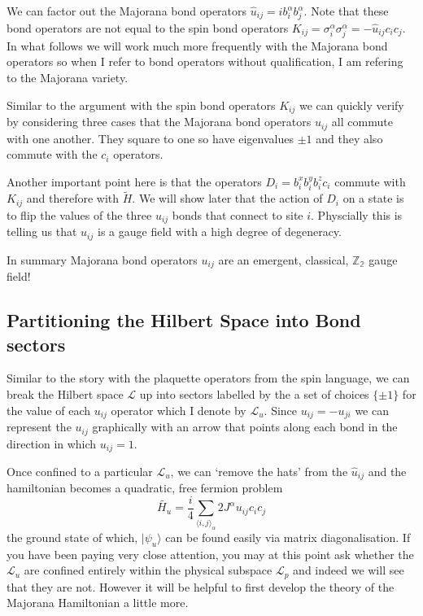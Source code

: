 We can factor out the Majorana bond operators
\(\hat{u}_{ij} = i b^\alpha_i b^\alpha_j\). Note that these bond
operators are not equal to the spin bond operators
\(K_{ij} = \sigma^\alpha_i \sigma^\alpha_j = - \hat{u}_{ij} c_i c_j\).
In what follows we will work much more frequently with the Majorana bond
operators so when I refer to bond operators without qualification, I am
refering to the Majorana variety.

Similar to the argument with the spin bond operators \(K_{ij}\) we can
quickly verify by considering three cases that the Majorana bond
operators \(u_{ij}\) all commute with one another. They square to one so
have eigenvalues \(\pm 1\) and they also commute with the \(c_i\)
operators.

Another important point here is that the operators
\(D_i = b^x_i b^y_i b^z_i c_i\) commute with \(K_{ij}\) and therefore
with \(\tilde{H}\). We will show later that the action of \(D_i\) on a
state is to flip the values of the three \(u_{ij}\) bonds that connect
to site \(i\). Physcially this is telling us that \(u_{ij}\) is a gauge
field with a high degree of degeneracy.

In summary Majorana bond operators \(u_{ij}\) are an emergent,
classical, \(\mathbb{Z_2}\) gauge field!

\hypertarget{partitioning-the-hilbert-space-into-bond-sectors}{%
\subsection{Partitioning the Hilbert Space into Bond
sectors}\label{partitioning-the-hilbert-space-into-bond-sectors}}

Similar to the story with the plaquette operators from the spin
language, we can break the Hilbert space \(\mathcal{L}\) up into sectors
labelled by the a set of choices \(\{\pm 1\}\) for the value of each
\(u_{ij}\) operator which I denote by \(\mathcal{L}_u\). Since
\(u_{ij} = -u_{ji}\) we can represent the \(u_{ij}\) graphically with an
arrow that points along each bond in the direction in which
\(u_{ij} = 1\).

Once confined to a particular \(\mathcal{L}_u\), we can `remove the
hats' from the \(\hat{u}_{ij}\) and the hamiltonian becomes a quadratic,
free fermion problem
\[\tilde{H_u} =  \frac{i}{4} \sum_{\langle i,j\rangle_\alpha} 2J^{\alpha} u_{ij} c_i c_j\]
the ground state of which, \(|\psi_u\rangle\) can be found easily via
matrix diagonalisation. If you have been paying very close attention,
you may at this point ask whether the \(\mathcal{L}_u\) are confined
entirely within the physical subspace \(\mathcal{L}_p\) and indeed we
will see that they are not. However it will be helpful to first develop
the theory of the Majorana Hamiltonian a little more.


